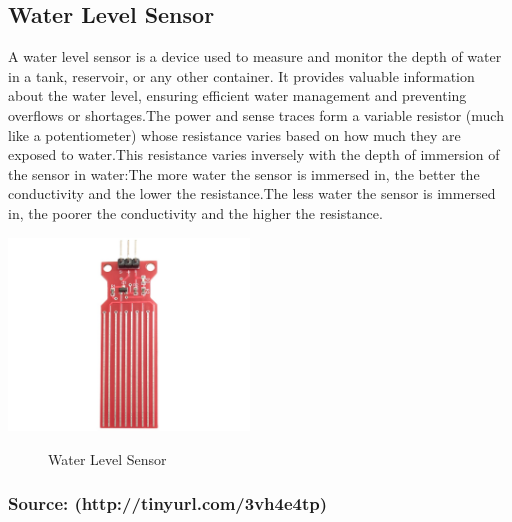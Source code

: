 \documentclass[12pt,a4paper]{report}
\begin{document}
	\subsection{Water Level Sensor}
	\begin{justify}A water level sensor is a device used to measure and monitor the depth of water in a tank, reservoir, or any other container. It provides valuable information about the water level, ensuring efficient water management and preventing overflows or shortages.The power and sense traces form a variable resistor (much like a potentiometer) whose resistance varies based on how much they are exposed to water.This resistance varies inversely with the depth of immersion of the sensor in water:The more water the sensor is immersed in, the better the conductivity and the lower the resistance.The less water the sensor is immersed in, the poorer the conductivity and the higher the resistance.
		
	\end{justify}
	
	\begin{center}
		\includegraphics[width=0.48\textwidth]{images//waterlevel.jpg} 
		
		\begin{figure}[ht]
			
			\caption{Water Level Sensor}
			
		\end{figure}
		\vspace{-20pt}
		\subsubsection{Source: (http://tinyurl.com/3vh4e4tp)}
	\end{center}
	
	
	
	
	
\end{document}
